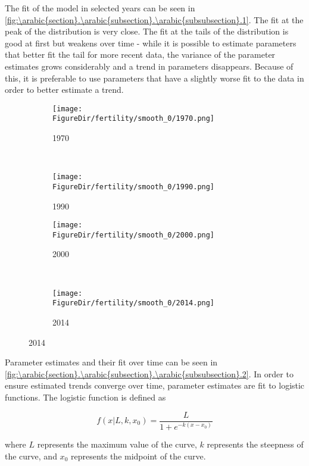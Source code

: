 \documentclass[10pt]{article}
\renewcommand{\thesection}{\arabic{section}}
\renewcommand{\thesubsection}{\thesection.\arabic{subsection}}
\renewcommand{\thesubsubsection}{\thesubsection.\arabic{subsubsection}}
\numberwithin{equation}{subsection}
\newcommand*{\FigureDir}{../../graphs}
\begin{document}
\par The fit of the model in selected years can be seen in \autoref{fig:\thesubsubsection.1}. The fit at the peak of the distribution is very close. The fit at the tails of the distribution is good at first but weakens over time - while it is possible to estimate parameters that better fit the tail for more recent data, the variance of the parameter estimates grows considerably and a trend in parameters disappears. Because of this, it is preferable to use parameters that have a slightly worse fit to the data in order to better estimate a trend.

\begin{figure}[!ht]
	\centering
   \caption{\label{fig:\thesubsubsection.1}Fertility Estimated by Generalized Beta 2}
		\begin{subfigure}{0.5\textwidth}
			\centering
			\texttt{[image: \\FigureDir/fertility/smooth\_0/1970.png]}
			\caption{1970}
		\end{subfigure}%
		~ %
		\begin{subfigure}{0.5\textwidth}
			\centering
			\texttt{[image: \\FigureDir/fertility/smooth\_0/1990.png]}
			\caption{1990}
		\end{subfigure}%
		\newline
		\begin{subfigure}{0.5\textwidth}
			\centering
			\texttt{[image: \\FigureDir/fertility/smooth\_0/2000.png]}
			\caption{2000}
		\end{subfigure}%
		~ %
		\begin{subfigure}{0.5\textwidth}
			\centering
			\texttt{[image: \\FigureDir/fertility/smooth\_0/2014.png]}
			\caption{2014}
		\end{subfigure}%
\end{figure}

\par Parameter estimates and their fit over time can be seen in \autoref{fig:\thesubsubsection.2}. In order to ensure estimated trends converge over time, parameter estimates are fit to logistic functions. The logistic function is defined as

\begin{equation}\label{eq:logistic_fn}
   f(x|L, k, x_0) = \frac{L}{1 + e^{-k(x-x_0)}}
\end{equation}

\noindent where \(L\) represents the maximum value of the curve, \(k\) represents the steepness of the curve, and \(x_0\) represents the midpoint of the curve.
\end{document}
